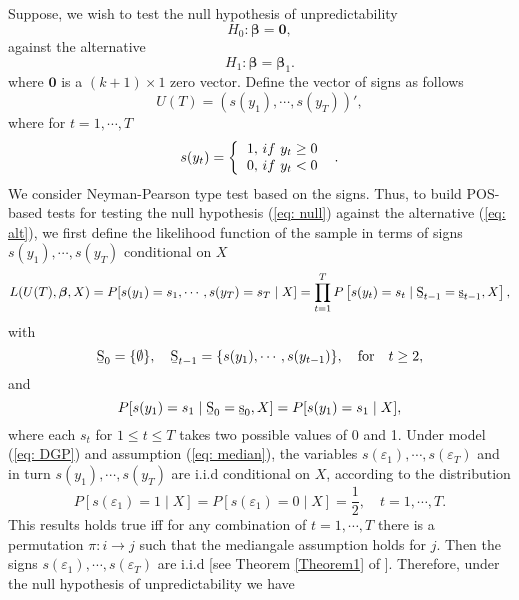 \documentclass[harvard,11pt]{article}
\begin{document}
Suppose, we wish to test the null hypothesis of unpredictability
\begin{equation}\label{eq: null}
H_0:\bm{\beta}=\bm{0},
\end{equation}
against the alternative
\begin{equation}\label{eq: alt}
H_1:\bm{\beta}=\bm{\beta}_1.
\end{equation}
where $\bm{0}$ is a $(k+1)\times 1$ zero vector. Define the vector of signs as follows
\begin{equation*}
U(T)=(s(y_1),\cdots,s(y_T))',
\end{equation*}
where for $t=1,\cdots,T$
\begin{equation*}
s(y_{t})=\left\{ 
\begin{tabular}{l}
$1,$ $if$ $y_{t}\geq 0$ \\ 
$0,$ $if$ $y_{t}<0$%
\end{tabular}%
\ \right. \text{.}
\end{equation*}
We consider Neyman-Pearson type test based on the signs. Thus, to build POS-based tests for testing the null hypothesis (\ref{eq: null}) against the alternative (\ref{eq: alt}), we first define the likelihood function of the sample in terms of signs $s(y_1),\cdots,s(y_T)$ conditional on $X$
\begin{equation}\label{eq: likelihood}
L(U(T),\bm{\beta},X)=P[s(y_1)=s_1,\cdots,s(y_T)=s_T\mid X]=\prod\limits_{t=1}^{T}P\left[s(y_t)=s_t\mid \text{\b{S}}_{t-1}=\text{\b{s}}_{t-1},X\right],
\end{equation}
with 
\begin{equation*}
\text{\b{S}}_{0}=\{\emptyset\},\quad \text{\b{S}}_{t-1}=\{s(y_1),\cdots,s(y_{t-1})\},\quad\text{for}\quad t\geq 2,
\end{equation*}
and
\[
P[s(y_1)=s_1\mid\text{\b{S}}_{0}=\text{\b{s}}_{0},X]=P[s(y_1)=s_1\mid X],
\]
where each $s_t$ for $1\leq t\leq T$ takes two possible values of 0 and 1. Under model (\ref{eq: DGP}) and assumption (\ref{eq: median}), the variables $s(\varepsilon_1),\cdots,s(\varepsilon_T)$ and in turn $s(y_1),\cdots,s(y_T)$ are i.i.d conditional on $X$, according to the distribution
\[
P[s(\varepsilon_1)=1\mid X]=P[s(\varepsilon_1)=0\mid X]=\frac{1}{2},\quad t=1,\cdots,T.
\]
This results holds true iff for any combination of $t=1,\cdots,T$ there is a permutation $\pi: i\rightarrow j$ such that the mediangale assumption holds for $j$. Then the signs $s(\varepsilon_1),\cdots,s(\varepsilon_T)$ are i.i.d [see Theorem \ref{Theorem1} of \citet{coudin2009finite}]. Therefore, under the null hypothesis of unpredictability we have
\end{document}
